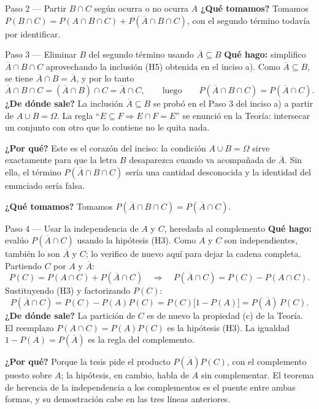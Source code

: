 \documentclass[11pt]{article}
\begin{document}
\begin{sol}
\begin{paso}{Paso 2 --- Partir $B\cap C$ según ocurra o no ocurra $A$}
\textbf{¿Qué tomamos?} Tomamos $P(B\cap C)=P(A\cap B\cap C)+P(\overline{A}\cap B\cap C)$, con
el segundo término todavía por identificar.
\end{paso}

\begin{paso}{Paso 3 --- Eliminar $B$ del segundo término usando $\overline{A}\subseteq B$}
\textbf{Qué hago:} simplifico $\overline{A}\cap B\cap C$ aprovechando la inclusión (H5)
obtenida en el inciso a). Como $\overline{A}\subseteq B$, se tiene $\overline{A}\cap B=
\overline{A}$, y por lo tanto
\[
\overline{A}\cap B\cap C=(\overline{A}\cap B)\cap C=\overline{A}\cap C,
\qquad\text{luego}\qquad
P(\overline{A}\cap B\cap C)=P(\overline{A}\cap C).
\]
\textbf{¿De dónde sale?} La inclusión $\overline{A}\subseteq B$ se probó en el Paso 3 del
inciso a) a partir de $A\cup B=\Omega$. La regla ``$E\subseteq F\Rightarrow E\cap F=E$'' se
enunció en la Teoría: intersecar un conjunto con otro que lo contiene no le quita nada.

\textbf{¿Por qué?} Este es el corazón del inciso: la condición $A\cup B=\Omega$ sirve
exactamente para que la letra $B$ desaparezca cuando va acompañada de $\overline{A}$. Sin
ella, el término $P(\overline{A}\cap B\cap C)$ sería una cantidad desconocida y la identidad
del enunciado sería falsa.

\textbf{¿Qué tomamos?} Tomamos $P(\overline{A}\cap B\cap C)=P(\overline{A}\cap C)$.
\end{paso}

\begin{paso}{Paso 4 --- Usar la independencia de $A$ y $C$, heredada al complemento}
\textbf{Qué hago:} evalúo $P(\overline{A}\cap C)$ usando la hipótesis (H3). Como $A$ y $C$ son
independientes, también lo son $\overline{A}$ y $C$; lo verifico de nuevo aquí para dejar la
cadena completa. Partiendo $C$ por $A$ y $\overline{A}$:
\[
P(C)=P(A\cap C)+P(\overline{A}\cap C)
\quad\Longrightarrow\quad
P(\overline{A}\cap C)=P(C)-P(A\cap C).
\]
Sustituyendo (H3) y factorizando $P(C)$:
\[
P(\overline{A}\cap C)=P(C)-P(A)P(C)=P(C)\bigl[1-P(A)\bigr]=P(\overline{A})\,P(C).
\]
\textbf{¿De dónde sale?} La partición de $C$ es de nuevo la propiedad (c) de la Teoría. El
reemplazo $P(A\cap C)=P(A)P(C)$ es la hipótesis (H3). La igualdad $1-P(A)=P(\overline{A})$ es
la regla del complemento.

\textbf{¿Por qué?} Porque la tesis pide el producto $P(\overline{A})P(C)$, con el complemento
puesto sobre $A$; la hipótesis, en cambio, habla de $A$ sin complementar. El teorema de
herencia de la independencia a los complementos es el puente entre ambas formas, y su
demostración cabe en las tres líneas anteriores.


\end{paso}
\end{sol}
\end{document}
